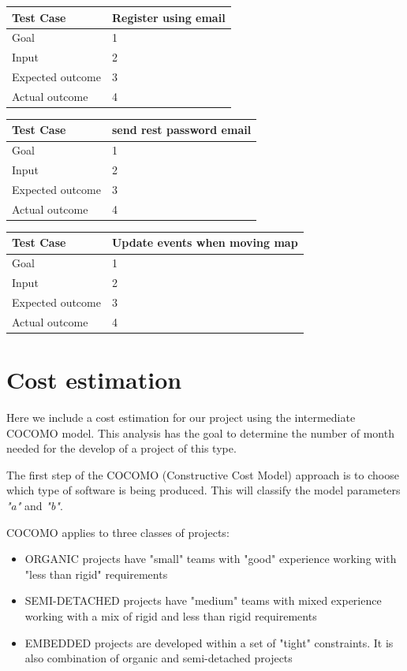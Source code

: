 \documentclass[a4paper]{scrreprt}
\begin{document}
\bigskip
\noindent
\begin{tabularx}{\linewidth}{|l|X|}
	\hline
	\textbf{Test Case} 	& \textbf{Register using email} \\ \hline
	Goal 				& 1 \\ \hline
	Input 				& 2 \\ \hline
	Expected outcome 	& 3 \\ \hline
	Actual outcome 		& 4 \\ \hline
\end{tabularx}
\bigskip
\noindent
\begin{tabularx}{\linewidth}{|l|X|}
	\hline
	\textbf{Test Case} 	& \textbf{send rest password email} \\ \hline
	Goal 				& 1 \\ \hline
	Input 				& 2 \\ \hline
	Expected outcome 	& 3 \\ \hline
	Actual outcome 		& 4 \\ \hline
\end{tabularx}
\bigskip
\noindent
\begin{tabularx}{\linewidth}{|l|X|}
	\hline
	\textbf{Test Case} 	& \textbf{Update events when moving map} \\ \hline
	Goal 				& 1 \\ \hline
	Input 				& 2 \\ \hline
	Expected outcome 	& 3 \\ \hline
	Actual outcome 		& 4 \\ \hline
\end{tabularx}



\chapter{Cost estimation}
Here we include a cost estimation for our project using the intermediate COCOMO model. This analysis has the goal to determine the number of month needed for the develop of a project of this type.

The first step of the COCOMO (Constructive Cost Model) approach is to choose which type of software is being produced. This will classify the model parameters \emph{"a"} and \emph{"b"}.

COCOMO applies to three classes of projects:
\begin{itemize}
	\item ORGANIC projects have "small" teams with "good" experience working with "less than rigid" requirements
	\item SEMI-DETACHED projects have "medium" teams with mixed experience working with a mix of rigid and less than rigid requirements
	\item EMBEDDED projects are developed within a set of "tight" constraints. It is also combination of organic and semi-detached projects
\end{itemize}
\end{document}
